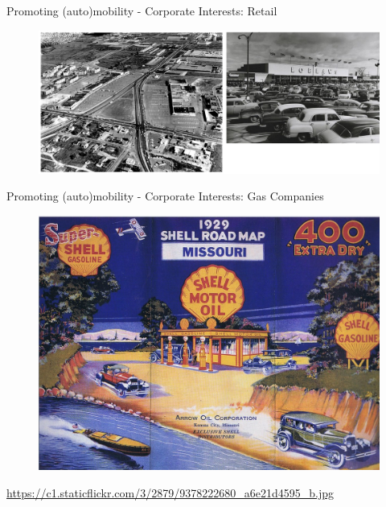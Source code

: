 \documentclass[aspectratio=169]{beamer}
\begin{document}





\begin{frame}
	
	Promoting (auto)mobility - Corporate Interests: Retail
	
	\begin{figure}
		\centering
		\includegraphics[width=1\linewidth]{images/golden_mile_old.png}
		
	\end{figure}

	
\end{frame}



\begin{frame}
	
	Promoting (auto)mobility - Corporate Interests: Gas Companies
	
	\begin{figure}
		\centering
		\includegraphics[width=0.75\linewidth]{images/shell_map_cover_1929.jpg}
		
	\end{figure}
	\tiny{\url{https://c1.staticflickr.com/3/2879/9378222680_a6e21d4595_b.jpg}}
	
\end{frame}
\end{document}
